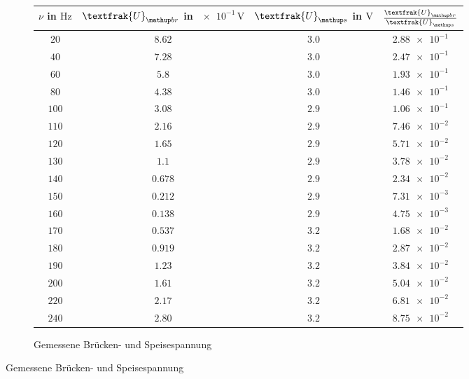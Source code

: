 \begin{figure}
\caption{Messwerte und Teilergebnise der  Wien-Robinson-Brücke}
\label{tab:mes_teil_wien}
\begin{subfigure}{0.49\textwidth}
\centering
\caption{Gemessene Brücken- und Speisespannung}
  \label{tab:U_br_u-s}
\begin{tabular}{S S S S}
    \toprule
    {$\nu$  in $\si{\hertz}$} &  {$\textfrak{U}\ua{br}$ in $\num{e-1}\,\si{\volt}$} & {$\textfrak{U}\ua{s}$  in $\si{\volt}$} & {$\frac{\textfrak{U}\ua{br}}{\textfrak{U}\ua{s}}$} \\
    \midrule
     {$\num{20}$} & {$\num{8.62}$} &  {$\num{3.0}$}& {$\num{2.88e-1}$}  \\
     {$\num{40}$} & {$\num{7.28}$}  & {$\num{3.0}$} & {$\num{2.47e-1}$} \\
     {$\num{60}$} & {$\num{5.8}$}  & {$\num{3.0}$} & {$\num{1.93e-1}$}  \\
     {$\num{80}$} & {$\num{4.38}$}  & {$\num{3.0}$} & {$\num{1.46e-1}$}  \\
     {$\num{100}$} & {$\num{3.08}$}  & {$\num{2.9}$} & {$\num{1.06e-1}$}  \\
     {$\num{110}$} & {$\num{2.16}$}  & {$\num{2.9}$} & {$\num{7.46e-2}$}  \\
     {$\num{120}$} & {$\num{1.65}$}  & {$\num{2.9}$} & {$\num{5.71e-2}$}  \\
     {$\num{130}$} & {$\num{1.1}$}  & {$\num{2.9}$} & {$\num{3.78e-2}$}  \\
     {$\num{140}$} & {$\num{0.678}$}  & {$\num{2.9}$} & {$\num{2.34e-2}$}  \\
     {$\num{150}$} & {$\num{0.212}$}  & {$\num{2.9}$} & {$\num{7.31e-3}$}  \\
     {$\num{160}$} & {$\num{0.138}$}  & {$\num{2.9}$} & {$\num{4.75e-3}$}  \\
     {$\num{170}$} & {$\num{0.537}$}  & {$\num{3.2}$} & {$\num{1.68e-2}$}  \\
     {$\num{180}$} & {$\num{0.919}$}  & {$\num{3.2}$} & {$\num{2.87e-2}$}  \\
     {$\num{190}$} & {$\num{1.23}$}  & {$\num{3.2}$} & {$\num{3.84e-2}$}  \\
     {$\num{200}$} & {$\num{1.61}$}  & {$\num{3.2}$} & {$\num{5.04e-2}$}  \\
     {$\num{220}$} & {$\num{2.17}$}  & {$\num{3.2}$} & {$\num{6.81e-2}$}  \\
     {$\num{240}$} & {$\num{2.80}$}  & {$\num{3.2}$} & {$\num{8.75e-2}$}  \\

\end{tabular}
\end{subfigure}
\end{figure}
